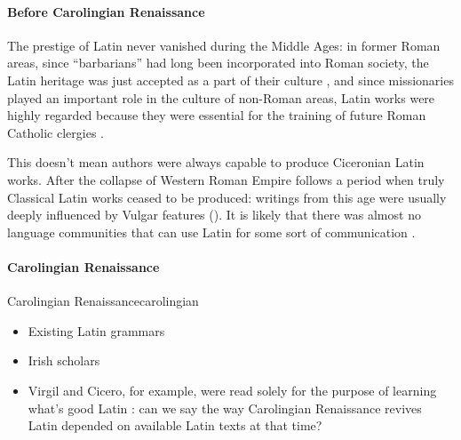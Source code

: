 \documentclass[a4paper, oneside, 12pt]{report}
\newcommand*{\citepage}[1]{p.~{#1}}
\begin{document}
\paragraph*{Before Carolingian Renaissance}
The prestige of Latin never vanished during the Middle Ages:
in former Roman areas, since ``barbarians'' had long been incorporated into Roman society, 
the Latin heritage was just accepted as a part of their culture 
\citep[\citepage{137}]{leonhardt2013latin},
and since missionaries played an important role in the culture of non-Roman areas, 
Latin works were highly regarded because they were essential 
for the training of future Roman Catholic clergies
\citep[\citepage{138}]{leonhardt2013latin}.

This doesn't mean authors were always capable to produce Ciceronian Latin works.
After the collapse of Western Roman Empire follows
a period when truly Classical Latin works ceased to be produced:
writings from this age were usually deeply influenced by Vulgar features 
().
It is likely that there was almost no language communities
that can use Latin for some sort of communication 
\citep[\citepage{160}]{leonhardt2013latin}.

\paragraph*{Carolingian Renaissance}

\begin{todobox}{Carolingian Renaissance}{carolingian}
    \begin{itemize}
        \item Existing Latin grammars 
        \item Irish scholars
        \item Virgil and Cicero, for example, were read solely for the purpose of learning what's good Latin
        \citep[\citepage{170}]{leonhardt2013latin}:
        can we say the way Carolingian Renaissance revives Latin
        depended on available Latin texts at that time?
    \end{itemize}
\end{todobox}
\end{document}
